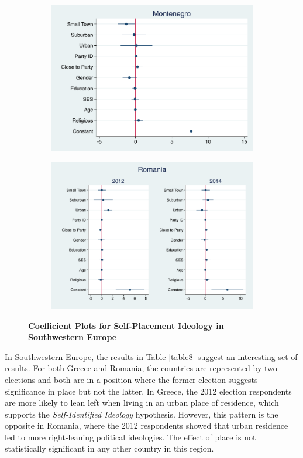 \documentclass[12pt, titlepage]{article}
\newcommand\e{\emph}
\newcommand\tb{\textbf}
\begin{document}
\begin{figure}[H]
\begin{subfigure}[b]{0.475\textwidth}
		\includegraphics[width=\textwidth]{IdeologyCoef/Montenegro}
	\end{subfigure}
	\quad
	\begin{subfigure}[b]{0.475\textwidth}   
		\centering 
		\includegraphics[width=\textwidth]{IdeologyCoef/Romania}
	\end{subfigure}
	\caption[ \tb{Self-Placement Ideology - Southwestern Europe} ]
	{\tb {Coefficient Plots for Self-Placement Ideology in Southwestern Europe} }
	\label{SWEuroIdeo}
\end{figure}

In Southwestern Europe, the results in Table \ref{table8} suggest an interesting set of results. For both Greece and Romania, the countries are represented by two elections and both are in a position where the former election suggests significance in place but not the latter. In Greece, the 2012 election respondents are more likely to lean left when living in an urban place of residence, which supports the \e{Self-Identified Ideology} hypothesis. However, this pattern is the opposite in Romania, where the 2012 respondents showed that urban residence led to more right-leaning political ideologies. The effect of place is not statistically significant in any other country in this region.
\end{document}
